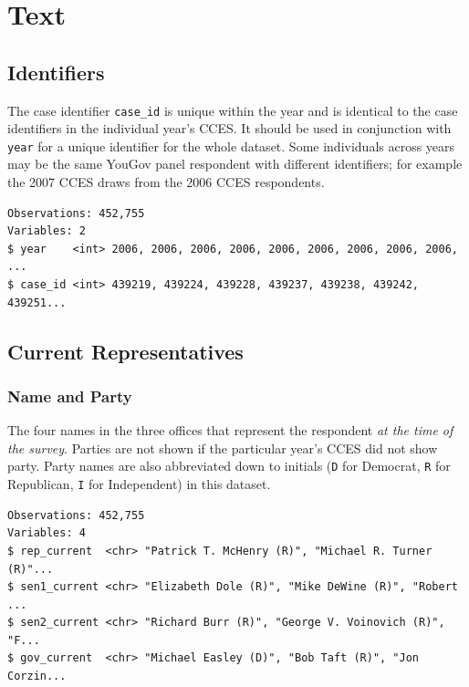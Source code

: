 \documentclass[10pt,article,oneside]{memoir}
\theoremstyle{definition}
\begin{document}
\newpage

\hypertarget{text}{%
\section{Text}\label{text}}

\hypertarget{identifiers}{%
\subsection{Identifiers}\label{identifiers}}

The case identifier \texttt{case\_id} is unique within the year and is
identical to the case identifiers in the individual year's CCES. It
should be used in conjunction with \texttt{year} for a unique identifier
for the whole dataset. Some individuals across years may be the same
YouGov panel respondent with different identifiers; for example the 2007
CCES draws from the 2006 CCES respondents.

\begin{verbatim}
Observations: 452,755
Variables: 2
$ year    <int> 2006, 2006, 2006, 2006, 2006, 2006, 2006, 2006, 2006, ...
$ case_id <int> 439219, 439224, 439228, 439237, 439238, 439242, 439251...
\end{verbatim}

\hypertarget{current-representatives}{%
\subsection{Current Representatives}\label{current-representatives}}

\hypertarget{name-and-party}{%
\subsubsection{Name and Party}\label{name-and-party}}

The four names in the three offices that represent the respondent
\emph{at the time of the survey}. Parties are not shown if the
particular year's CCES did not show party. Party names are also
abbreviated down to initials (\texttt{D} for Democrat, \texttt{R} for
Republican, \texttt{I} for Independent) in this dataset.

\begin{verbatim}
Observations: 452,755
Variables: 4
$ rep_current  <chr> "Patrick T. McHenry (R)", "Michael R. Turner (R)"...
$ sen1_current <chr> "Elizabeth Dole (R)", "Mike DeWine (R)", "Robert ...
$ sen2_current <chr> "Richard Burr (R)", "George V. Voinovich (R)", "F...
$ gov_current  <chr> "Michael Easley (D)", "Bob Taft (R)", "Jon Corzin...
\end{verbatim}
\end{document}
